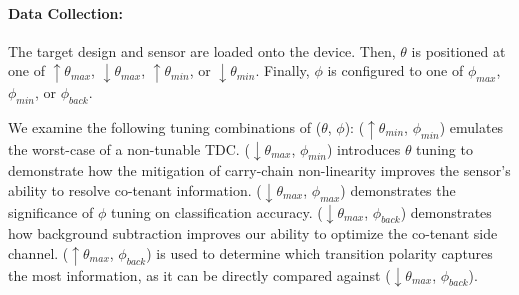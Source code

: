 \paragraph{Data Collection: }
The target design and sensor are loaded onto the device. Then, $\theta$ is positioned at one of $\uparrow\theta_{max}$, $\downarrow\theta_{max}$, $\uparrow\theta_{min}$, or $\downarrow\theta_{min}$. Finally, $\phi$ is configured to one of $\phi_{max}$, $\phi_{min}$, or $\phi_{back}$.

We examine the following tuning combinations of ($\theta$, $\phi$): ($\uparrow\theta_{min}$, $\phi_{min}$) emulates the worst-case of a non-tunable TDC. ($\downarrow\theta_{max}$, $\phi_{min}$) introduces $\theta$ tuning to demonstrate how the mitigation of carry-chain non-linearity improves the sensor’s ability to resolve co-tenant information. ($\downarrow\theta_{max}$, $\phi_{max}$) demonstrates the significance of $\phi$ tuning on classification accuracy. ($\downarrow\theta_{max}$, $\phi_{back}$) demonstrates how background subtraction improves our ability to optimize the co-tenant side channel. ($\uparrow\theta_{max}$, $\phi_{back}$) is used to determine which transition polarity captures the most information, as it can be directly compared against ($\downarrow\theta_{max}$, $\phi_{back}$).


    
